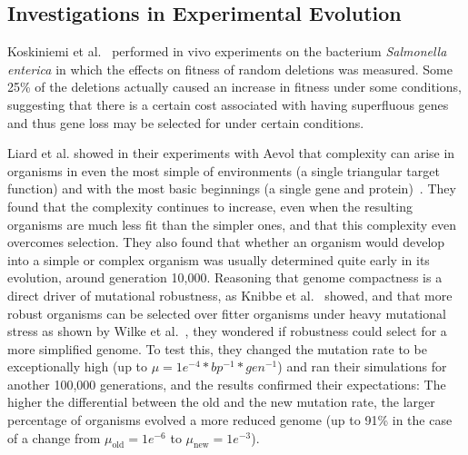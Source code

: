 \subsection{Investigations in Experimental Evolution}

Koskiniemi et al.~\cite{koskiniemi2012} performed in vivo experiments on the bacterium \textit{Salmonella enterica} in which the effects on fitness of random deletions was measured. Some 25\% of the deletions actually caused an increase in fitness under some conditions, suggesting that there is a certain cost associated with having superfluous genes and thus gene loss may be selected for under certain conditions.

Liard et al. showed in their experiments with Aevol that complexity can arise in organisms in even the most simple of environments (a single triangular target function) and with the most basic beginnings (a single gene and protein)~\cite{Liard.2018}. They found that the complexity continues to increase, even when the resulting organisms are much less fit than the simpler ones, and that this complexity even overcomes selection. They also found that whether an organism would develop into a simple or complex organism was usually determined quite early in its evolution, around generation 10,000. Reasoning that genome compactness is a direct driver of mutational robustness, as Knibbe et al.~\cite{Knibbe2007} showed, and that more robust organisms can be selected over fitter organisms under heavy mutational stress as shown by Wilke et al.~\cite{wilke2001evolution}, they wondered if robustness could select for a more simplified genome. To test this, they changed the mutation rate to be exceptionally high (up to $\mu = 1e^{-4} *bp^{-1}*gen^{-1}$) and ran their simulations for another 100,000 generations, and the results confirmed their expectations: The higher the differential between the old and the new mutation rate, the larger percentage of organisms evolved a more reduced genome (up to 91\% in the case of a change from $\mu_\text{old}=1e^{-6}$ to $\mu_\text{new}=1e^{-3}$).




